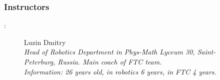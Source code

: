 \subsubsection{Instructors}:

\begin{figure}[H]
	
	\begin{minipage}[h]{0.47\linewidth}
		Luzin Dmitry\\
		\emph{Head of Robotics Department in Phys-Math Lyceum 30, Saint-Peterburg, Russia. Main coach of FTC team.\\}
		\emph{Information: 26 years old, in robotics 6 years, in FTC 4 years.}
	\end{minipage}
	\hfill
	\begin{minipage}{0.47\linewidth}
		\\
	\end{minipage}
	\vfill
	\begin{minipage}[h]{0.47\linewidth}

\end{minipage}
\end{figure}
